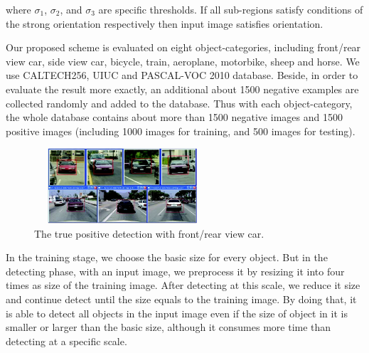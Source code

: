 where $\sigma_1$, $\sigma_2$, and $\sigma_3$ are specific thresholds. If all sub-regions satisfy
conditions of the strong orientation respectively then input image
satisfies orientation.

Our proposed scheme is evaluated on eight object-categories,
including front/rear view car, side view car, bicycle, train, aeroplane,
motorbike, sheep and horse. We use CALTECH256, UIUC and
PASCAL-VOC 2010 database. Beside, in order to evaluate the result
more exactly, an additional about 1500 negative examples are
collected randomly and added to the database. Thus with each
object-category, the whole database contains about more than 1500
negative images and 1500 positive images (including 1000 images
for training, and 500 images for testing).
\begin{figure}[ht]
  \centering
  \includegraphics[width=2.6in,height=1.1in]{images/car_example.jpg}
  \caption{The true positive detection with front/rear view car.}
  \label{fig:car_example}
\end{figure}
In the training stage, we choose the basic size for every object. But in the detecting
phase, with an input image, we preprocess it by resizing it into four
times as size of the training image. After detecting at this scale, we reduce it size and continue detect
until the size equals to the training image. By doing that, it is able to
detect all objects in the input image even if the size of object in it is
smaller or larger than the basic size, although it consumes more time
than detecting at a specific scale.
